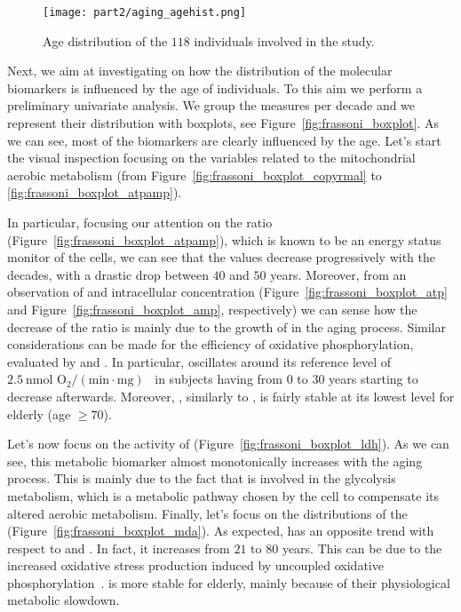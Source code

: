 \begin{figure}[]
	\centering
	\texttt{[image: part2/aging\_agehist.png]}
	\caption{Age distribution of the $118$ individuals involved in the study.} \label{fig:frassoni_agehist}
\end{figure}

Next, we aim at investigating on how the distribution of the molecular biomarkers is influenced by the age of individuals. To this aim we perform a preliminary univariate analysis. We group the measures per decade and we represent their distribution with boxplots, see Figure~\ref{fig:frassoni_boxplot}.
As we can see, most of the biomarkers are clearly influenced by the age.
Let's start the visual inspection focusing on the variables related to the mitochondrial aerobic metabolism (from Figure~\ref{fig:frassoni_boxplot_copyrmal} to \ref{fig:frassoni_boxplot_atpamp}).

In particular, focusing our attention on the \atpamp ratio (Figure~\ref{fig:frassoni_boxplot_atpamp}), which is known to be an energy status monitor of the cells, we can see that the values decrease progressively with the decades, with a drastic drop between $40$ and $50$ years. Moreover, from an observation of \atp and \amp intracellular concentration (Figure~\ref{fig:frassoni_boxplot_atp} and Figure~\ref{fig:frassoni_boxplot_amp}, respectively) we can sense how the decrease of the \atpamp ratio is mainly due to the growth of \amp in the aging process.
Similar considerations can be made for the efficiency of oxidative phosphorylation, evaluated by \popyrmal and \posucc. In particular, \popyrmal oscillates around its reference level of $2.5~\text{nmol~O}_2/(\text{min}\cdot\text{mg})$~\cite{hinkle2005p} in subjects having from $0$ to $30$ years starting to decrease afterwards. Moreover, \popyrmal, similarly to \atpamp, is fairly stable at its lowest level for elderly (age $\geq 70$).

Let's now focus on the activity of \LDH (Figure~\ref{fig:frassoni_boxplot_ldh}). As we can see, this metabolic biomarker almost monotonically increases with the aging process.
This is mainly due to the fact that \LDH is involved in the glycolysis metabolism, which is a metabolic pathway chosen by the cell to compensate its altered aerobic metabolism.
Finally, let's focus on the distributions of the \mda (Figure~\ref{fig:frassoni_boxplot_mda}). As expected, \mda has an opposite trend with respect to \atpamp and \popyrmal. In fact, it increases from $21$ to $80$ years. This can be due to the increased oxidative stress production induced by uncoupled oxidative phosphorylation~\cite{dai2014mitochondrial}.
\mda is more stable for elderly, mainly because of their physiological metabolic slowdown.


